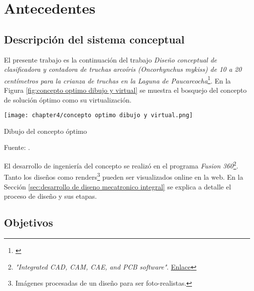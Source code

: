 
\pagestyle{myportland}
\doublespacing
\chapter[----- Antecedentes]{Antecedentes}
\thispagestyle{myportland}

\section{Descripción del sistema conceptual}
\label{sec:descripcion del sistema conceptual}

El presente trabajo es la continuación del trabajo \textit{Dise{\~{n}}o conceptual de clasificadora y contadora de truchas arco{\'{i}}ris (Oncorhynchus mykiss) de 10 a 20 cent{\'{i}}metros para la crianza de truchas en la Laguna de Paucarcocha}\footnote{\cite{DiazVergara2020}}. En la Figura \ref{fig:concepto optimo dibujo y virtual} se muestra el bosquejo del concepto de solución óptimo como su virtualización.

\begin{myfigure}[H]
	\centering
	\texttt{[image: chapter4/concepto optimo dibujo y virtual.png]}
	\caption{Dibujo del concepto óptimo}
	\begin{myflushleftportland}
		Fuente: \cite{DiazVergara2020}.
	\end{myflushleftportland}
	\label{fig:concepto optimo dibujo y virtual}
\end{myfigure}

El desarrollo de ingeniería del concepto se realizó en el programa \textit{Fusion 360}\footnote{\textit{"Integrated CAD, CAM, CAE, and PCB software"}. \href{https://www.autodesk.com/products/fusion-360/overview}{Enlace}}. Tanto los diseños como renders\footnote{Imágenes procesadas de un diseño para ser foto-realistas.} pueden ser visualizados online en la web. En la Sección \ref{sec:desarrollo de diseno mecatronico integral} se explica a detalle el proceso de diseño y sus etapas.

\section{Objetivos}

